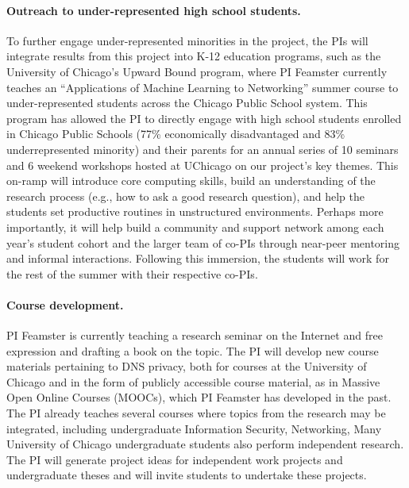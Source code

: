 \paragraph{Outreach to under-represented high school students.}
To further engage under-represented minorities in the project, the PIs will
integrate results from this project into K-12 education programs, such as the
University of Chicago's Upward Bound program, where PI Feamster currently
teaches an ``Applications of Machine Learning to Networking'' summer course to
under-represented students across the Chicago Public School system.
This program  has allowed the PI to directly engage with high
school students  enrolled in Chicago Public Schools (77\% economically
disadvantaged and 83\% underrepresented minority) and their parents for an
annual series of 10 seminars and 6 weekend workshops hosted at UChicago on our
project's key themes.
This on-ramp will introduce core computing
skills, build an understanding of the research process (e.g., how to ask a
good research question), and help the students set productive routines in
unstructured environments.  Perhaps more importantly, it will help build a
community and support network among each year's student cohort and the larger
team of co-PIs through near-peer mentoring and informal interactions.
Following this immersion, the students will work for the rest of the summer
with their respective co-PIs.

\paragraph{Course development.} PI Feamster is currently teaching a research
seminar on the Internet and free expression and drafting a book on the topic.
The PI will develop new course materials pertaining to DNS privacy, both for
courses at the University of Chicago and in the form of publicly accessible
course material, as in Massive Open Online Courses (MOOCs), which PI Feamster
has developed in the past. The PI already teaches several courses where topics
from the research may be integrated, including undergraduate Information
Security, Networking, Many University of Chicago undergraduate students
also perform independent research. The PI will generate project ideas for
independent work projects and undergraduate theses and will invite students to
undertake these projects.


